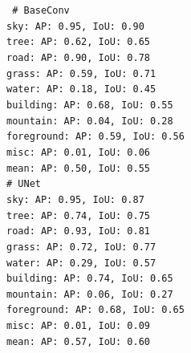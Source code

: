 \documentclass[11pt]{article}
\begin{document}
{\centering \tt \small
\# BaseConv \\
sky: AP: 0.95, IoU: 0.90 \\
tree: AP: 0.62, IoU: 0.65 \\
road: AP: 0.90, IoU: 0.78 \\
grass: AP: 0.59, IoU: 0.71 \\
water: AP: 0.18, IoU: 0.45 \\
building: AP: 0.68, IoU: 0.55 \\
mountain: AP: 0.04, IoU: 0.28 \\
foreground: AP: 0.59, IoU: 0.56 \\
misc: AP: 0.01, IoU: 0.06 \\
mean: AP: 0.50, IoU: 0.55 \\

\# UNet \\
sky: AP: 0.95, IoU: 0.87 \\
tree: AP: 0.74, IoU: 0.75 \\
road: AP: 0.93, IoU: 0.81 \\
grass: AP: 0.72, IoU: 0.77 \\
water: AP: 0.29, IoU: 0.57 \\
building: AP: 0.74, IoU: 0.65 \\
mountain: AP: 0.06, IoU: 0.27 \\
foreground: AP: 0.68, IoU: 0.65 \\
misc: AP: 0.01, IoU: 0.09 \\
mean: AP: 0.57, IoU: 0.60 \\
}
\end{document}
